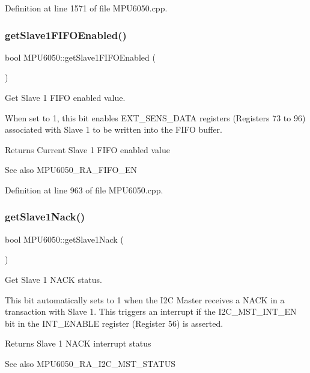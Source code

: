 Definition at line 1571 of file M\+P\+U6050.\+cpp.

\mbox{\label{classMPU6050_afd6a9b55a589c83c9a0fb0b5b2a88234}} 
\subsubsection{\texorpdfstring{getSlave1FIFOEnabled()}{getSlave1FIFOEnabled()}}
{\footnotesize\ttfamily bool M\+P\+U6050\+::get\+Slave1\+F\+I\+F\+O\+Enabled (\begin{DoxyParamCaption}{ }\end{DoxyParamCaption})}



Get Slave 1 F\+I\+FO enabled value. 

When set to 1, this bit enables E\+X\+T\+\_\+\+S\+E\+N\+S\+\_\+\+D\+A\+TA registers (Registers 73 to 96) associated with Slave 1 to be written into the F\+I\+FO buffer. \begin{DoxyReturn}{Returns}
Current Slave 1 F\+I\+FO enabled value 
\end{DoxyReturn}
\begin{DoxySeeAlso}{See also}
M\+P\+U6050\+\_\+\+R\+A\+\_\+\+F\+I\+F\+O\+\_\+\+EN 
\end{DoxySeeAlso}


Definition at line 963 of file M\+P\+U6050.\+cpp.

\mbox{\label{classMPU6050_a65cc9d75ff347b146414685fb83fa451}} 
\subsubsection{\texorpdfstring{getSlave1Nack()}{getSlave1Nack()}}
{\footnotesize\ttfamily bool M\+P\+U6050\+::get\+Slave1\+Nack (\begin{DoxyParamCaption}{ }\end{DoxyParamCaption})}



Get Slave 1 N\+A\+CK status. 

This bit automatically sets to 1 when the I2C Master receives a N\+A\+CK in a transaction with Slave 1. This triggers an interrupt if the I2\+C\+\_\+\+M\+S\+T\+\_\+\+I\+N\+T\+\_\+\+EN bit in the I\+N\+T\+\_\+\+E\+N\+A\+B\+LE register (Register 56) is asserted. \begin{DoxyReturn}{Returns}
Slave 1 N\+A\+CK interrupt status 
\end{DoxyReturn}
\begin{DoxySeeAlso}{See also}
M\+P\+U6050\+\_\+\+R\+A\+\_\+\+I2\+C\+\_\+\+M\+S\+T\+\_\+\+S\+T\+A\+T\+US 
\end{DoxySeeAlso}


